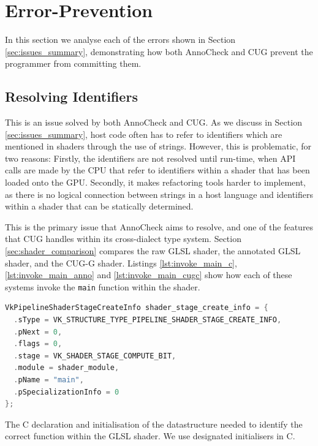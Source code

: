\documentclass[a4paper,12pt,twoside,openright]{report}
\begin{document}
\section{Error-Prevention}

In this section we analyse each of the errors shown in Section
\ref{sec:issues_summary}, demonstrating how both AnnoCheck and CUG prevent the
programmer from committing them.

\subsection{Resolving Identifiers}

\label{sec:resolving_identifiers}

This is an issue solved by both AnnoCheck and CUG. As we discuss in Section
\ref{sec:issues_summary}, host code often has to refer to identifiers which are
mentioned in shaders through the use of strings. However, this is problematic,
for two reasons: Firstly, the identifiers are not resolved until run-time, when
API calls are made by the CPU that refer to identifiers within a shader that
has been loaded onto the GPU. Secondly, it makes refactoring tools harder to
implement, as there is no logical connection between strings in a host language
and identifiers within a shader that can be statically determined.

This is the primary issue that AnnoCheck aims to resolve, and one of the
features that CUG handles within its cross-dialect type system. Section
\ref{sec:shader_comparison} compares the raw GLSL shader, the annotated GLSL
shader, and the CUG-G shader. Listings \ref{lst:invoke_main_c},
\ref{lst:invoke_main_anno} and \ref{lst:invoke_main_cugc} show how each of
these systems invoke the \texttt{main} function within the shader.

\begin{lstfloat}
\begin{lstlisting}[language=C]
VkPipelineShaderStageCreateInfo shader_stage_create_info = {
  .sType = VK_STRUCTURE_TYPE_PIPELINE_SHADER_STAGE_CREATE_INFO,
  .pNext = 0,
  .flags = 0,
  .stage = VK_SHADER_STAGE_COMPUTE_BIT,
  .module = shader_module,
  .pName = "main",
  .pSpecializationInfo = 0
};
\end{lstlisting}
\caption{The C declaration and initialisation of the datastructure needed to
identify the correct function within the GLSL shader. We use designated initialisers
in C\cite{DesignatedInitC}.}
\label{lst:invoke_main_c}
\end{lstfloat}
\end{document}

